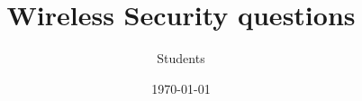 \documentclass{exam}
\title{Wireless Security questions}
\date{\today}
\author{Students}
\begin{document}
\maketitle
\tableofcontents

\printanswers %



\end{document}

